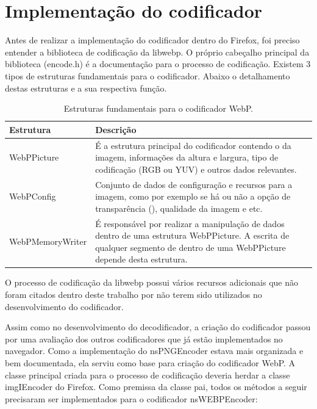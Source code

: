 \documentclass[espaco=simples,appendix=Name]{abnt}
\begin{document}
\section{Implementação do codificador}

Antes de realizar a implementação do codificador dentro do Firefox, foi preciso entender a biblioteca de codificação da libwebp. O próprio cabeçalho principal da biblioteca (encode.h) é a documentação para o processo de codificação. Existem 3 tipos de estruturas fundamentais para o codificador. Abaixo o detalhamento destas estruturas e a sua respectiva função.

\begin{table}[ht]
        \centering
        \caption{Estruturas fundamentais para o codificador WebP.
        \label{tbl:padc}}{
                \vspace{0.3cm}
                \begin{tabular}{|l|p{10cm}|}
                \hline
                        \textbf{Estrutura} & \textbf{Descrição} \\
                        \hline
                        WebPPicture		& É a estrutura principal do codificador contendo o \ingles{buffer} da imagem, informações da altura e largura, tipo de codificação (RGB ou YUV) e outros dados relevantes. \\
                        \hline
                        WebPConfig		& Conjunto de dados de configuração e recursos para a imagem, como por exemplo se há ou não a opção de transparência (\ingles{alpha}), qualidade da imagem e etc.  \\
                        \hline
                        WebPMemoryWriter	& É responsável por realizar a manipulação de dados dentro de uma estrutura WebPPicture. A escrita de qualquer segmento de \ingles{buffer} dentro de uma WebPPicture depende desta estrutura. \\
                        \hline
                \end{tabular}
                }
\end{table}

O processo de codificação da libwebp possui vários recursos adicionais que não foram citados dentro deste trabalho por não terem sido utilizados no desenvolvimento do codificador.

Assim como no desenvolvimento do decodificador, a criação do codificador passou por uma avaliação dos outros codificadores que já estão implementados no navegador. Como a implementação do nsPNGEncoder estava mais organizada e bem documentada, ela serviu como base para criação do codificador WebP. A classe principal criada para o processo de codificação deveria herdar a classe imgIEncoder do Firefox. Como premissa da classe pai, todos os métodos a seguir precisaram ser implementados para o codificador nsWEBPEncoder:
\end{document}
